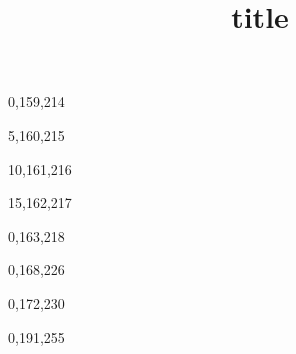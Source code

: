\documentclass{article}
\title{title}
\begin{document}
\newcommand{\testcolor}[1]{{\colorbox[RGB]{#1}{\parbox[c][2in]{2in}{#1}}}}

\pagecolor{cyan}
\Huge
\noindent
\testcolor{0,159,214}
\testcolor{5,160,215}
\testcolor{10,161,216}
\testcolor{15,162,217}
\testcolor{0,163,218}
\testcolor{0,168,226}
\testcolor{0,172,230}
\testcolor{0,191,255}
\end{document}
